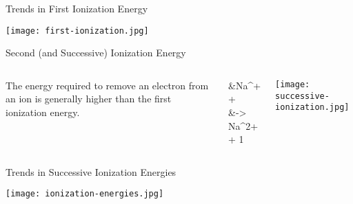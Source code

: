 \documentclass[notes=only]{beamer}
\begin{document}
\begin{frame}{Trends in First Ionization Energy}
	\begin{center}
		\texttt{[image: first-ionization.jpg]}
	\end{center}

\end{frame}

\begin{frame}{Second (and Successive) Ionization Energy}
	\begin{columns}
		The energy required to remove an electron from an \alert{ion} is
		generally higher than the first ionization energy.
		
		\begin{reactions*}
			&Na^{+}\gas{} +  \\
			&\qquad -> Na^{2+}\gas{} + 1 \el
		\end{reactions*}
		\begin{center}
			\texttt{[image: successive-ionization.jpg]}
		\end{center}
	\end{columns}
\end{frame}

\begin{frame}{Trends in Successive Ionization Energies}
	\begin{center}
		\texttt{[image: ionization-energies.jpg]}
	\end{center}
\end{frame}
\end{document}
